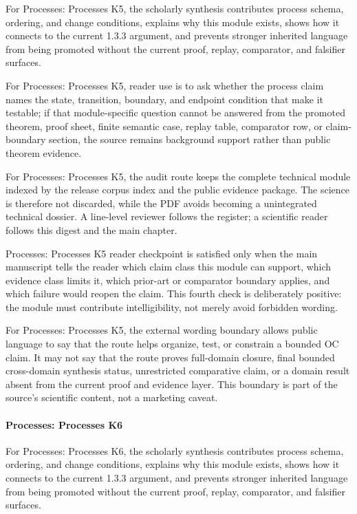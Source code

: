 For Processes: Processes K5, the scholarly synthesis contributes process schema, ordering, and change conditions, explains why this module exists, shows how it connects to the current 1.3.3 argument, and prevents stronger inherited language from being promoted without the current proof, replay, comparator, and falsifier surfaces.


For Processes: Processes K5, reader use is to ask whether the process claim names the state, transition, boundary, and endpoint condition that make it testable; if that module-specific question cannot be answered from the promoted theorem, proof sheet, finite semantic case, replay table, comparator row, or claim-boundary section, the source remains background support rather than public theorem evidence.


For Processes: Processes K5, the audit route keeps the complete technical module indexed by the release corpus index and the public evidence package. The science is therefore not discarded, while the PDF avoids becoming a unintegrated technical dossier. A line-level reviewer follows the register; a scientific reader follows this digest and the main chapter.


Processes: Processes K5 reader checkpoint is satisfied only when the main manuscript tells the reader which claim class this module can support, which evidence class limits it, which prior-art or comparator boundary applies, and which failure would reopen the claim. This fourth check is deliberately positive: the module must contribute intelligibility, not merely avoid forbidden wording.


For Processes: Processes K5, the external wording boundary allows public language to say that the route helps organize, test, or constrain a bounded OC claim. It may not say that the route proves full-domain closure, final bounded cross-domain synthesis status, unrestricted comparative claim, or a domain result absent from the current proof and evidence layer. This boundary is part of the source's scientific content, not a marketing caveat.


\paragraph{Processes: Processes K6}

For Processes: Processes K6, the scholarly synthesis contributes process schema, ordering, and change conditions, explains why this module exists, shows how it connects to the current 1.3.3 argument, and prevents stronger inherited language from being promoted without the current proof, replay, comparator, and falsifier surfaces.


